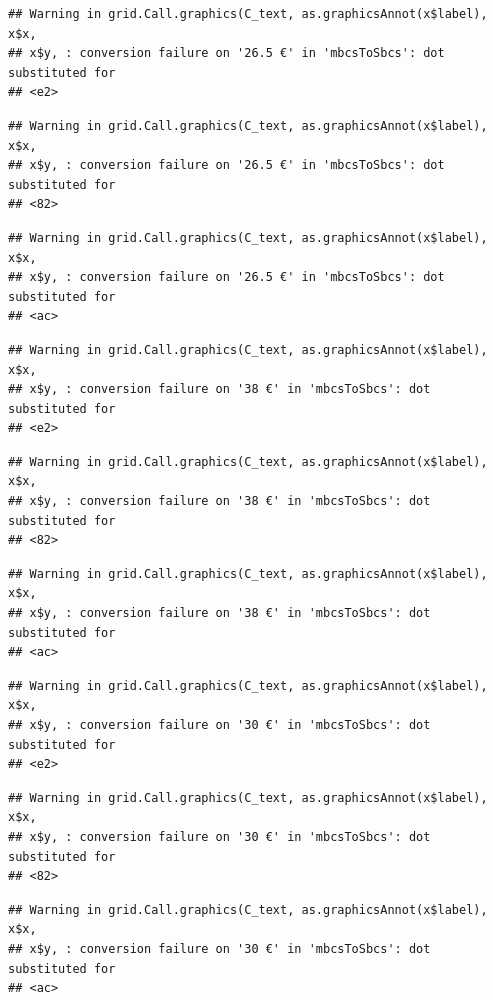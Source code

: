 \documentclass[]{gitbook}
\theoremstyle{definition}
\theoremstyle{definition}
\theoremstyle{definition}
\theoremstyle{remark}
\begin{document}
\begin{verbatim}
## Warning in grid.Call.graphics(C_text, as.graphicsAnnot(x$label), x$x,
## x$y, : conversion failure on '26.5 €' in 'mbcsToSbcs': dot substituted for
## <e2>
\end{verbatim}

\begin{verbatim}
## Warning in grid.Call.graphics(C_text, as.graphicsAnnot(x$label), x$x,
## x$y, : conversion failure on '26.5 €' in 'mbcsToSbcs': dot substituted for
## <82>
\end{verbatim}

\begin{verbatim}
## Warning in grid.Call.graphics(C_text, as.graphicsAnnot(x$label), x$x,
## x$y, : conversion failure on '26.5 €' in 'mbcsToSbcs': dot substituted for
## <ac>
\end{verbatim}

\begin{verbatim}
## Warning in grid.Call.graphics(C_text, as.graphicsAnnot(x$label), x$x,
## x$y, : conversion failure on '38 €' in 'mbcsToSbcs': dot substituted for
## <e2>
\end{verbatim}

\begin{verbatim}
## Warning in grid.Call.graphics(C_text, as.graphicsAnnot(x$label), x$x,
## x$y, : conversion failure on '38 €' in 'mbcsToSbcs': dot substituted for
## <82>
\end{verbatim}

\begin{verbatim}
## Warning in grid.Call.graphics(C_text, as.graphicsAnnot(x$label), x$x,
## x$y, : conversion failure on '38 €' in 'mbcsToSbcs': dot substituted for
## <ac>
\end{verbatim}

\begin{verbatim}
## Warning in grid.Call.graphics(C_text, as.graphicsAnnot(x$label), x$x,
## x$y, : conversion failure on '30 €' in 'mbcsToSbcs': dot substituted for
## <e2>
\end{verbatim}

\begin{verbatim}
## Warning in grid.Call.graphics(C_text, as.graphicsAnnot(x$label), x$x,
## x$y, : conversion failure on '30 €' in 'mbcsToSbcs': dot substituted for
## <82>
\end{verbatim}

\begin{verbatim}
## Warning in grid.Call.graphics(C_text, as.graphicsAnnot(x$label), x$x,
## x$y, : conversion failure on '30 €' in 'mbcsToSbcs': dot substituted for
## <ac>
\end{verbatim}
\end{document}

